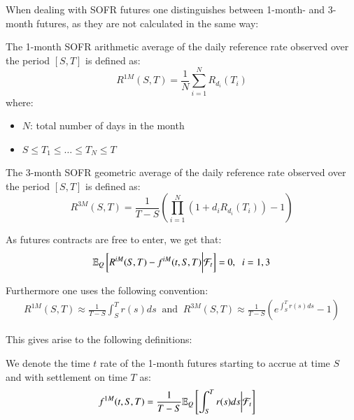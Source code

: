 \newpage 

When dealing with SOFR futures one distinguishes between 1-month- and 3-month futures, as they are not calculated in the same way:

\begin{definition}
The 1-month 
SOFR arithmetic average of the daily reference rate observed over the period $[S,T]$ is defined as: 
\[
R^{1M}(S,T) = \frac{1}{N}\sum_{i=1}^{N}R_{d_{i}}(T_{i})
\]
where:
\begin{itemize}[leftmargin=*]
    \item $N$: total number of days in the month
    \item $S\leq T_{1} \leq \dots \leq T_{N} \leq T$ 
\end{itemize}
\end{definition}

\begin{definition}
The 3-month 
SOFR geometric average of the daily reference rate observed over the period $[S,T]$ is defined as: 
\[
R^{3M}(S,T) = \frac{1}{T-S}\left(
\prod_{i=1}^{N}(1+d_{i}R_{d_{i}}(T_{i})) - 1
\right)
\]
\end{definition}


As futures contracts are free to enter, we get that: 
\begin{align*}
\mathbb{E}_{Q}\left[
R^{iM}(S,T) - f^{iM}(t,S,T)\bigg{|}\mathcal{F}_{t}
\right] = 0, \;\; i = 1,3   
\end{align*}

Furthermore one uses the following convention: 
\begin{align*}
R^{1M}(S,T) \approx  \frac{1}{T-S}\int_{S}^{T}r(s)ds 
\;\;\text{and}\;\;
R^{3M}(S,T) \approx  \frac{1}{T-S}\left(e^{\int_{S}^{T}r(s)ds} -1\right) 
\end{align*}

This gives arise to the following definitions:

\begin{definition}
\label{def: 1M_SOFR_futures}
We denote the time $t$ rate of the 1-month futures starting to accrue at time $S$ and with settlement on time $T$ as:
\begin{align*}
f^{1M}(t,S,T) &= \frac{1}{T-S}\mathbb{E}_{Q}\left[
\int_{S}^{T}r(s)ds\bigg{|}\mathcal{F}_{t}
\right]    
\end{align*}
\end{definition} 

